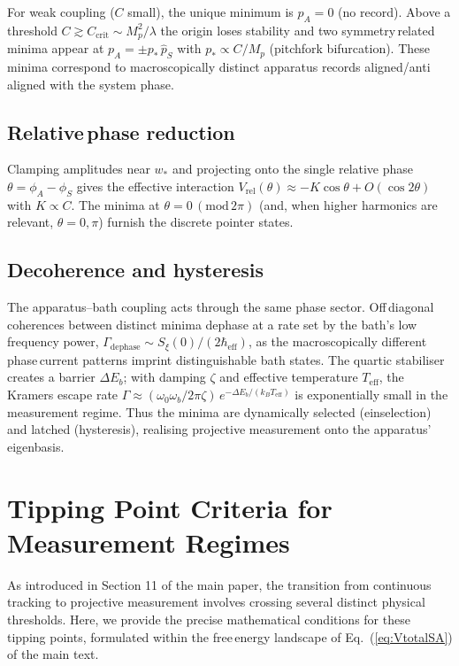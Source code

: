 \documentclass[11pt]{article}
\begin{document}
For weak coupling ($C$ small), the unique minimum is $p_A=0$ (no record). Above a threshold $C\gtrsim C_\mathrm{crit}\sim M_p^2/\lambda$ the origin loses stability and two symmetry\,related minima appear at $p_A=\pm p_*\,\hat p_S$ with $p_*\propto C/M_p$ (pitchfork bifurcation). These minima correspond to macroscopically distinct apparatus records aligned/anti\,aligned with the system phase.

\subsection*{Relative\,phase reduction}
Clamping amplitudes near $w_*$ and projecting onto the single relative phase $\theta=\phi_A-\phi_S$ gives the effective interaction $V_{\mathrm{rel}}(\theta)\approx -K\cos\theta+O(\cos2\theta)$ with $K\propto C$. The minima at $\theta=0\,(\mathrm{mod}\,2\pi)$ (and, when higher harmonics are relevant, $\theta=0,\pi$) furnish the discrete pointer states.

\subsection*{Decoherence and hysteresis}
The apparatus–bath coupling acts through the same phase sector. Off\,diagonal coherences between distinct minima dephase at a rate set by the bath's low\,frequency power, $\Gamma_{\mathrm{dephase}}\sim S_\xi(0)/(2\hbar_{\mathrm{eff}})$, as the macroscopically different phase\,current patterns imprint distinguishable bath states. The quartic stabiliser creates a barrier $\Delta E_b$; with damping $\zeta$ and effective temperature $T_{\mathrm{eff}}$, the Kramers escape rate $\Gamma\approx(\omega_0\omega_b/2\pi\zeta)\,e^{-\Delta E_b/(k_B T_{\mathrm{eff}})}$ is exponentially small in the measurement regime. Thus the minima are dynamically selected (einselection) and latched (hysteresis), realising projective measurement onto the apparatus' eigenbasis.

\section{Tipping Point Criteria for Measurement Regimes}\label{si:thresholds}
As introduced in Section 11 of the main paper, the transition from continuous tracking to projective measurement involves crossing several distinct physical thresholds. Here, we provide the precise mathematical conditions for these tipping points, formulated within the free\,energy landscape of Eq.~(\ref{eq:VtotalSA}) of the main text.
\end{document}
